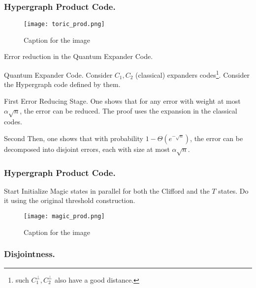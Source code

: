 \documentclass{beamer}
\begin{document}
\begin{frame}
  \frametitle{Hypergraph Product Code.}

\begin{figure}[h]
    \centering
    \texttt{[image: toric\_prod.png]}
    \caption{Caption for the image}
    \label{fig:your-label}
\end{figure}

\end{frame}

\begin{frame}{Error reduction in the Quantum Expander Code.}
  \begin{block}{Quantum Expander Code.}
    Consider $C_{1},C_{2}$ (classical) expanders codes\footnote{such $C_{1}^{\perp}, C_{2}^{\perp}$ also have a good distance.}. Consider the Hypergraph code defined by them.
  \end{block}


  \begin{block}{First}
  Error  Reducing Stage. One shows that for any error with weight at most $\alpha \sqrt{n}$, the error can be reduced. The proof uses the expansion in the classical codes.
\end{block}

\begin{block}{Second}
  Then, one shows that with probability $1 - \Theta(e^{-\sqrt{n}})$, the error can be decomposed into disjoint errors, each with size at most $\alpha \sqrt{n}$.
  \end{block} 
\end{frame}


\begin{frame}
  \frametitle{Hypergraph Product Code.}

  \begin{block}{Start}
Initialize Magic states in parallel for both the Clifford and the $T$ states. Do it using the original threshold construction.
  \end{block}


\begin{figure}[h]
    \centering
    \texttt{[image: magic\_prod.png]}
    \caption{Caption for the image}
    \label{fig:your-label}
\end{figure}
\end{frame}



\begin{frame}
  \frametitle{Disjointness.}
\end{frame}
\end{document}
